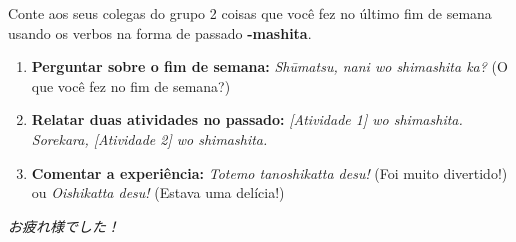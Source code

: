 \documentclass[12pt,a4paper]{article}
\begin{document}
\begin{tcolorbox}[colback=jppurple!6, colframe=jppurple, title=\textbf{Dinâmica em Grupo}, fonttitle=\bfseries]
\small
Conte aos seus colegas do grupo 2 coisas que você fez no último fim de semana usando os verbos na forma de passado \textbf{-mashita}.

\vspace{0.2cm}

\begin{enumerate}[leftmargin=*]
    \item \textbf{Perguntar sobre o fim de semana:} \textit{Shūmatsu, nani wo shimashita ka?} (O que você fez no fim de semana?)
    \item \textbf{Relatar duas atividades no passado:} \textit{[Atividade 1] wo shimashita. Sorekara, [Atividade 2] wo shimashita.}
    \item \textbf{Comentar a experiência:} \textit{Totemo tanoshikatta desu!} (Foi muito divertido!) ou \textit{Oishikatta desu!} (Estava uma delícia!)
\end{enumerate}
\end{tcolorbox}

\vspace{0.4cm}

\begin{center}
    \small\color{gray} \textit{お疲れ様でした！}
\end{center}
\end{document}
